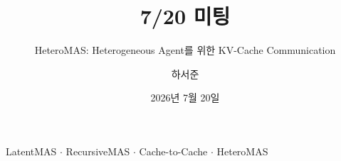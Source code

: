 \documentclass[
11pt,notheorems,hyperref={pdfauthor=whatever}
]{beamer}
\title[]{7/20 미팅}
\subtitle{HeteroMAS: Heterogeneous Agent를 위한 KV-Cache Communication}
\author[]{하서준}
\institute{DGIST}
\date{2026년 7월 20일}
\begin{document}
{
\begin{frame}
  \titlepage
  \vspace{-0.8em}
  \begin{center}
  \scriptsize
  LatentMAS \(\cdot\) RecursiveMAS \(\cdot\) Cache-to-Cache \(\cdot\) HeteroMAS
  \end{center}
\end{frame}
}
\addtocounter{framenumber}{-1}


\end{document}
